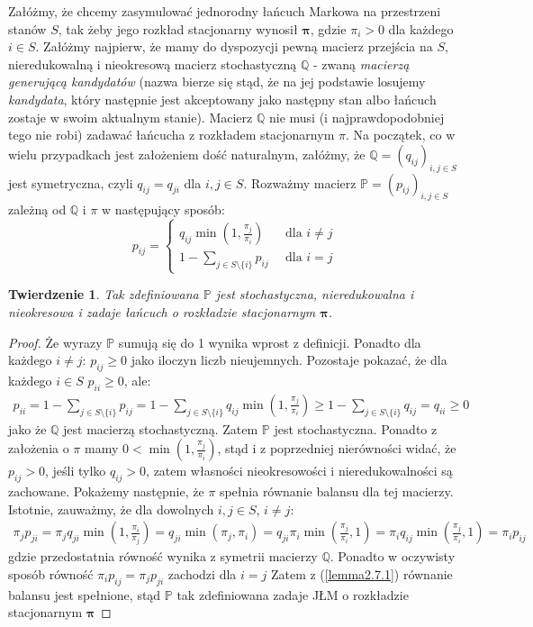 \documentclass[a4paper]{article}
\theoremstyle{defn}
\theoremstyle{theorem}
\newtheorem{theorem}[defn]{Twierdzenie}
\theoremstyle{lemma}
\theoremstyle{cor}
\theoremstyle{fact}
\begin{document}
Załóżmy, że chcemy zasymulować jednorodny łańcuch Markowa na przestrzeni stanów $S$, tak żeby jego rozkład stacjonarny wynosił $\boldsymbol{\pi}$, gdzie $\pi_i > 0$ dla każdego $i \in S$. Załóżmy najpierw, że mamy do dyspozycji pewną macierz przejścia na $S$, nieredukowalną i nieokresową macierz stochastyczną $\mathbb{Q}$ - zwaną \textit{macierzą generującą kandydatów} (nazwa bierze się stąd, że na jej podstawie losujemy \textit{kandydata}, który następnie jest akceptowany jako następny stan albo łańcuch zostaje w swoim aktualnym stanie). Macierz $\mathbb{Q}$ nie musi (i najprawdopodobniej tego nie robi) zadawać łańcucha z rozkładem stacjonarnym $\pi$. Na początek, co w wielu przypadkach jest założeniem dość naturalnym, załóżmy, że $\mathbb{Q} = (q_{ij})_{i,j \in S}$ jest symetryczna, czyli $q_{ij} = q_{ji}$ dla $i,j \in S$. Rozważmy macierz $\mathbb{P} = (p_{ij})_{i,j \in S}$ zależną od $\mathbb{Q}$ i $\pi$ w następujący sposób:
$$
    p_{ij} = \begin{cases} q_{ij} \min(1, \frac{\pi_j}{\pi_i}) \,\,\,&\text{dla $i \neq j$}\\
                    1 - \sum\limits_{j \in S \setminus \{i\}} p_{ij}\,\,\, &\text{dla $i = j$}
            \end{cases}
$$
\begin{theorem}\label{theorem3.3.1}
Tak zdefiniowana $\mathbb{P}$ jest stochastyczna, nieredukowalna i nieokresowa i zadaje łańcuch o rozkładzie stacjonarnym $\boldsymbol{\pi}$.
\end{theorem}
\begin{proof}
Że wyrazy $\mathbb{P}$ sumują się do 1 wynika wprost z definicji. Ponadto dla każdego $i \neq j$: $p_{ij} \geq 0$ jako iloczyn liczb nieujemnych. Pozostaje pokazać, że dla każdego $i \in S$ $p_{ii} \geq 0$, ale:
\begin{align*}
    p_{ii} = 1 - \sum\limits_{j \in S\setminus \{i\}} p_{ij} = 1 - \sum\limits_{j \in S\setminus \{i\}} q_{ij}\min(1, \frac{\pi_j}{\pi_i}) \geq 1 - \sum\limits_{j \in S\setminus \{i\}} q_{ij} = q_{ii} \geq 0
\end{align*}
jako że $\mathbb{Q}$ jest macierzą stochastyczną. Zatem $\mathbb{P}$ jest stochastyczna. Ponadto z założenia o $\pi$ mamy $0 < \min(1, \frac{\pi_j}{\pi_i})$, stąd i z poprzedniej nierówności widać, że $p_{ij} > 0$, jeśli tylko $q_{ij} > 0$, zatem własności nieokresowości i nieredukowalności są zachowane.  Pokażemy następnie, że $\pi$ spełnia równanie balansu dla tej macierzy. Istotnie, zauważmy, że dla dowolnych $i,j \in S$, $i \neq j$:
\begin{align*}
    \pi_j p_{ji} = \pi_j q_{ji} \min(1, \frac{\pi_i}{\pi_j}) =  q_{ji} \min(\pi_j, \pi_i) = q_{ji} \pi_i \min(\frac{\pi_j}{\pi_i}, 1) =  \pi_i q_{ij} \min(\frac{\pi_j}{\pi_i}, 1) = \pi_i p_{ij}
\end{align*}
gdzie przedostatnia równość wynika z symetrii macierzy $\mathbb{Q}$. Ponadto w oczywisty sposób równość $\pi_i p_{ij} = \pi_j p_{ji}$ zachodzi dla $i = j$ Zatem z (\ref{lemma2.7.1}) równanie balansu jest spełnione, stąd $\mathbb{P}$ tak zdefiniowana zadaje JŁM o rozkładzie stacjonarnym $\boldsymbol{\pi}$
\end{proof}
\end{document}
